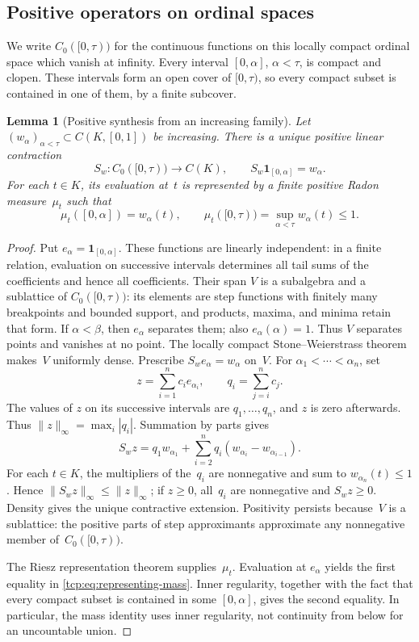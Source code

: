 \documentclass[preprint,12pt,nopreprintline]{elsarticle}
\newtheorem{lemma}[theorem]{Lemma}
\theoremstyle{definition}
\theoremstyle{remark}
\numberwithin{equation}{section}
\begin{document}
\subsection{Positive operators on ordinal spaces}
\label{subsec:positive-operators}

We write $C_0([0,\tau))$ for the continuous functions on this locally compact ordinal space which vanish at infinity. Every interval $[0,\alpha]$, $\alpha<\tau$, is compact and clopen. These intervals form an open cover of $[0,\tau)$, so every compact subset is contained in one of them, by a finite subcover.

\begin{lemma}[Positive synthesis from an increasing family]
\label{tcp:lem:positive-synthesis}
Let $(w_\alpha)_{\alpha<\tau}\subset C(K,[0,1])$ be increasing.
There is a unique positive linear contraction
\[
 S_w:C_0([0,\tau))\longrightarrow C(K),\qquad
 S_w\mathbf1_{[0,\alpha]}=w_\alpha.
\]
For each $t\in K$, its evaluation at~$t$ is represented by a finite
positive Radon measure~$\mu_t$ such that
\begin{equation}
 \mu_t([0,\alpha])=w_\alpha(t),\qquad
 \mu_t([0,\tau))=\sup_{\alpha<\tau}w_\alpha(t)\le1.
 \label{tcp:eq:representing-mass}
\end{equation}
\end{lemma}

\begin{proof}
Put $e_\alpha=\mathbf1_{[0,\alpha]}$. These functions are linearly independent: in a finite relation, evaluation on successive intervals determines all tail sums of the coefficients and hence all coefficients. Their span $V$ is a subalgebra and a sublattice of $C_0([0,\tau))$: its elements are step functions with finitely many breakpoints and bounded support, and products, maxima, and minima retain that form. If $\alpha<\beta$, then $e_\alpha$ separates them; also $e_\alpha(\alpha)=1$. Thus $V$ separates points and vanishes at no point. The locally compact Stone--Weierstrass theorem makes~$V$ uniformly dense. Prescribe $S_we_\alpha=w_\alpha$ on~$V$. For $\alpha_1<\cdots<\alpha_n$, set
\[
 z=\sum_{i=1}^n c_i e_{\alpha_i},\qquad
 q_i=\sum_{j=i}^n c_j.
\]
The values of $z$ on its successive intervals are $q_1,\ldots,q_n$, and $z$ is zero afterwards. Thus $\|z\|_\infty=\max_i|q_i|$.
Summation by parts gives
\[
 S_wz=q_1w_{\alpha_1}
       +\sum_{i=2}^n q_i(w_{\alpha_i}-w_{\alpha_{i-1}}).
\]
For each $t\in K$, the multipliers of the~$q_i$ are nonnegative and sum to $w_{\alpha_n}(t)\le1$. Hence
$\|S_wz\|_\infty\le\|z\|_\infty$; if $z\ge0$, all~$q_i$ are nonnegative and $S_wz\ge0$. Density gives the unique contractive
extension. Positivity persists because~$V$ is a sublattice: the positive parts of step approximants approximate any nonnegative
member of~$C_0([0,\tau))$.

The Riesz representation theorem supplies~$\mu_t$. Evaluation at $e_\alpha$ yields the first equality in
\eqref{tcp:eq:representing-mass}. Inner regularity, together with the fact that every compact subset is contained in some $[0,\alpha]$, gives the second equality. In particular, the mass identity uses inner regularity, not continuity from below for an uncountable union.
\end{proof}
\end{document}
